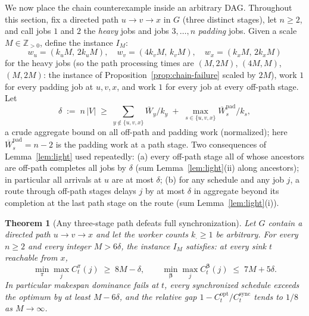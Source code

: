 \documentclass[sn-mathphys,NameDate]{sn-jnl}
\theoremstyle{thmstyleone}
\newtheorem{theorem}{Theorem}
\theoremstyle{thmstylethree}
\theoremstyle{thmstyletwo}
\begin{document}
We now place the chain counterexample inside an arbitrary DAG.
Throughout this section, fix a directed path
$u \to v \to x$ in $G$ (three distinct stages), let
$n \geq 2$, and call jobs $1$ and $2$ the \emph{heavy} jobs
and jobs $3, \ldots, n$ \emph{padding} jobs. Given a scale
$M \in \mathbb{Z}_{>0}$, define the instance $I_M$:
\[
  w_u = (k_u M,\, 2 k_u M),\quad
  w_v = (4 k_v M,\, k_v M),\quad
  w_x = (k_x M,\, 2 k_x M)
\]
for the heavy jobs (so the path processing times are
$(M, 2M)$, $(4M, M)$, $(M, 2M)$: the instance of
Proposition~\ref{prop:chain-failure} scaled by $2M$), work $1$
for every padding job at $u, v, x$, and work
$1$ for every job at every off-path stage. Let
\[
  \delta \;:=\; n\,|V|
  \;\geq\; \sum_{y \notin \{u,v,x\}} \overline{W}_y / k_y
  \;+\; \max_{s \in \{u,v,x\}} \overline{W}^{\mathrm{pad}}_s / k_s ,
\]
a crude aggregate bound on all off-path and padding work
(normalized); here
$\overline{W}^{\mathrm{pad}}_s = n - 2$ is the padding work at
a path stage. Two consequences of Lemma~\ref{lem:light} used
repeatedly: (a) every off-path stage all of whose ancestors are
off-path completes all jobs by $\delta$ (sum
Lemma~\ref{lem:light}(ii) along ancestors); in particular all
arrivals at $u$ are at most $\delta$; (b) for any schedule and
any job $j$, a route through off-path stages delays $j$ by at
most $\delta$ in aggregate beyond its completion at the last
path stage on the route (sum Lemma~\ref{lem:light}(i)).

\begin{theorem}[Any three-stage path defeats full
synchronization]
\label{thm:negative}
Let $G$ contain a directed path $u \to v \to x$ and let the
worker counts $k_\cdot \geq 1$ be arbitrary. For every
$n \geq 2$ and every integer $M > 6\delta$, the instance
$I_M$ satisfies: at every sink $t$ reachable from $x$,
\[
  \min_{\pi} \max_j C^\pi_t(j) \;\geq\; 8M - \delta,
  \qquad
  \min_{\boldsymbol\beta} \max_j C^{\boldsymbol\beta}_t(j)
  \;\leq\; 7M + 5\delta .
\]
In particular makespan dominance fails at $t$, every
synchronized schedule exceeds the optimum by at least
$M - 6\delta$, and the relative gap
$1 - C^{\mathrm{opt}}_t / C^{\mathrm{sync}}_t$ tends to $1/8$
as $M \to \infty$.
\end{theorem}
\end{document}
